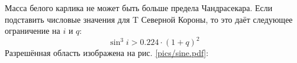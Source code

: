 
Масса белого карлика не может быть больше предела Чандрасекара. Если подставить числовые значения для T Северной Короны, то это даёт следующее ограничение на $i$ и $q$:
\[
\sin^3 i > 0.224 \cdot (1 + q)^2
\]
Разрешённая область изображена на рис. \ref{pics/sine.pdf}:













